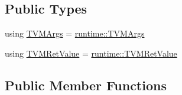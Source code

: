 \subsection*{Public Types}
\begin{DoxyCompactItemize}
\item 
using \hyperlink{classtvm_1_1BaseAttrsNode_a257561dad74174cbdc08f6725a45d8ac}{T\+V\+M\+Args} = \hyperlink{classtvm_1_1runtime_1_1TVMArgs}{runtime\+::\+T\+V\+M\+Args}
\item 
using \hyperlink{classtvm_1_1BaseAttrsNode_a1f56f080d0c1fab79d9469029aef8ebb}{T\+V\+M\+Ret\+Value} = \hyperlink{classtvm_1_1runtime_1_1TVMRetValue}{runtime\+::\+T\+V\+M\+Ret\+Value}
\end{DoxyCompactItemize}
\subsection*{Public Member Functions}
